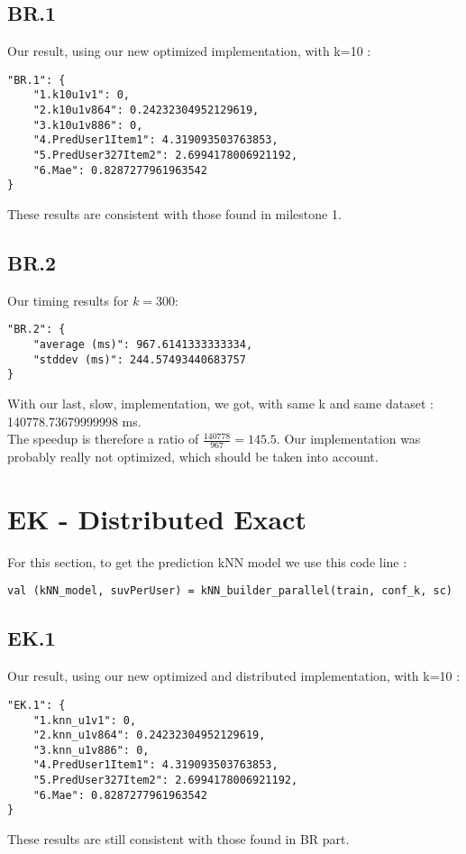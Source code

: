 \documentclass{article}
\begin{document}
\subsection{BR.1}
Our result, using our new optimized implementation, with k=10 :
\begin{lstlisting}[style=json]
"BR.1": {
    "1.k10u1v1": 0,
    "2.k10u1v864": 0.24232304952129619,
    "3.k10u1v886": 0,
    "4.PredUser1Item1": 4.319093503763853,
    "5.PredUser327Item2": 2.6994178006921192,
    "6.Mae": 0.8287277961963542
}
\end{lstlisting}
These results are consistent with those found in milestone 1.

\subsection{BR.2}
Our timing results for $k=300$:
\begin{lstlisting}[style=json]
"BR.2": {
    "average (ms)": 967.6141333333334,
    "stddev (ms)": 244.57493440683757
}
\end{lstlisting}
With our last, slow, implementation, we got, with same k and same dataset : 140778.73679999998 ms. \\
The speedup is therefore a ratio of $\frac{140778}{967}=145.5$. Our implementation was probably really not optimized, which should be taken into account.

\section{EK - Distributed Exact}
For this section, to get the prediction kNN model we use this code line :
\begin{lstlisting}[style=scala]
val (kNN_model, suvPerUser) = kNN_builder_parallel(train, conf_k, sc)
\end{lstlisting}

\subsection{EK.1}
Our result, using our new optimized and distributed implementation, with k=10 :
\begin{lstlisting}[style=json]
"EK.1": {
    "1.knn_u1v1": 0,
    "2.knn_u1v864": 0.24232304952129619,
    "3.knn_u1v886": 0,
    "4.PredUser1Item1": 4.319093503763853,
    "5.PredUser327Item2": 2.6994178006921192,
    "6.Mae": 0.8287277961963542
}
\end{lstlisting}
These results are still consistent with those found in BR part.
\end{document}
